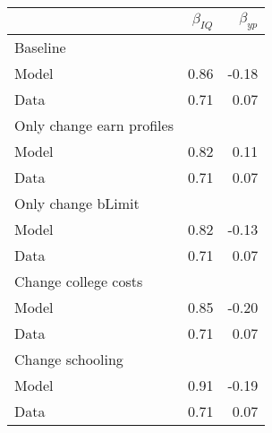 \begin{tabular}{lrr}
\hline
  & $\beta_{IQ}$  & $\beta_{yp}$  \\
\hline
Baseline &   &   \\
Model & 0.86  & -0.18  \\
Data & 0.71  & 0.07  \\
Only change earn profiles &   &   \\
Model & 0.82  & 0.11  \\
Data & 0.71  & 0.07  \\
Only change bLimit &   &   \\
Model & 0.82  & -0.13  \\
Data & 0.71  & 0.07  \\
Change college costs &   &   \\
Model & 0.85  & -0.20  \\
Data & 0.71  & 0.07  \\
Change schooling &   &   \\
Model & 0.91  & -0.19  \\
Data & 0.71  & 0.07  \\
\hline
\end{tabular}%
